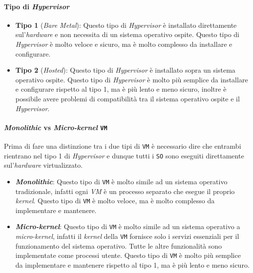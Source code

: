         \paragraph{Tipo di \textit{Hypervisor}}
            \begin{itemize}
                \item \textbf{Tipo 1} (\textit{Bare Metal}): Questo tipo di \textit{Hypervisor} è installato direttamente sul'\textit{hardware} e non necessita di un sistema operativo ospite. Questo tipo di \textit{Hypervisor} è molto veloce e sicuro, ma è molto complesso da installare e configurare.
                \item \textbf{Tipo 2} (\textit{Hosted}): Questo tipo di \textit{Hypervisor} è installato sopra un sistema operativo ospite. Questo tipo di \textit{Hypervisor} è molto più semplice da installare e configurare rispetto al tipo 1, ma è più lento e meno sicuro, inoltre è possibile avere problemi di compatibilità tra il sistema operativo ospite e il \textit{Hypervisor}.
            \end{itemize}
        \paragraph{\textit{Monolithic} vs \textit{Micro-kernel} \texttt{VM}}
            Prima di fare una distinzione tra i due tipi di \texttt{VM} è necessario dire che entrambi rientrano nel tipo 1 di \textit{Hypervisor} e dunque tutti i \texttt{SO} sono eseguiti direttamente sul'\textit{hardware} virtualizzato.
            \begin{itemize}
                \item \textbf{\textit{Monolithic}}: Questo tipo di \texttt{VM} è molto simile ad un sistema operativo tradizionale, infatti ogni \textit{VM} è un processo separato che esegue il proprio \textit{kernel}. Questo tipo di \texttt{VM} è molto veloce, ma è molto complesso da implementare e mantenere.
                \item \textbf{\textit{Micro-kernel}}: Questo tipo di \texttt{VM} è molto simile ad un sistema operativo a \textit{micro-kernel}, infatti il \textit{kernel} della \texttt{VM} fornisce solo i servizi essenziali per il funzionamento del sistema operativo. Tutte le altre funzionalità sono implementate come processi utente. Questo tipo di \texttt{VM} è molto più semplice da implementare e mantenere rispetto al tipo 1, ma è più lento e meno sicuro.
            \end{itemize}
